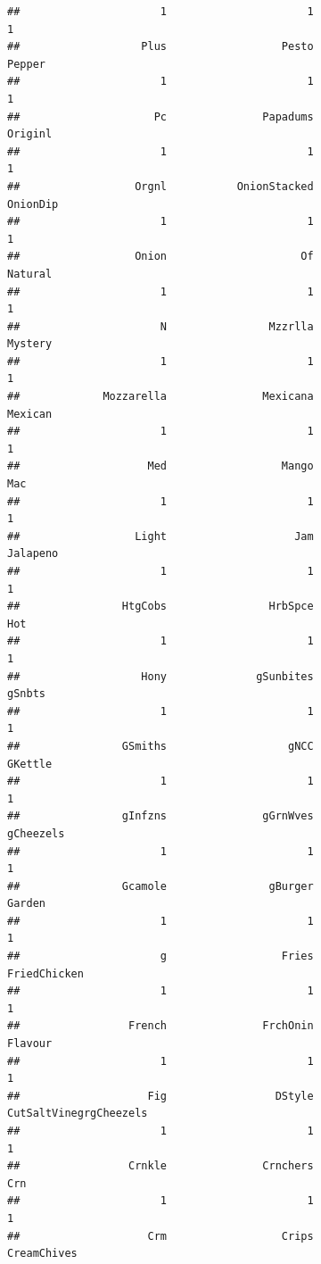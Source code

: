 \documentclass[
]{article}
\begin{document}
\begin{verbatim}
##                      1                      1                      1 
##                   Plus                  Pesto                 Pepper 
##                      1                      1                      1 
##                     Pc               Papadums                Originl 
##                      1                      1                      1 
##                  Orgnl           OnionStacked               OnionDip 
##                      1                      1                      1 
##                  Onion                     Of                Natural 
##                      1                      1                      1 
##                      N                Mzzrlla                Mystery 
##                      1                      1                      1 
##             Mozzarella               Mexicana                Mexican 
##                      1                      1                      1 
##                    Med                  Mango                    Mac 
##                      1                      1                      1 
##                  Light                    Jam               Jalapeno 
##                      1                      1                      1 
##                HtgCobs                HrbSpce                    Hot 
##                      1                      1                      1 
##                   Hony              gSunbites                 gSnbts 
##                      1                      1                      1 
##                GSmiths                   gNCC                GKettle 
##                      1                      1                      1 
##                gInfzns               gGrnWves              gCheezels 
##                      1                      1                      1 
##                Gcamole                gBurger                 Garden 
##                      1                      1                      1 
##                      g                  Fries           FriedChicken 
##                      1                      1                      1 
##                 French               FrchOnin                Flavour 
##                      1                      1                      1 
##                    Fig                 DStyle CutSaltVinegrgCheezels 
##                      1                      1                      1 
##                 Crnkle               Crnchers                    Crn 
##                      1                      1                      1 
##                    Crm                  Crips            CreamChives 

\end{verbatim}
\end{document}
